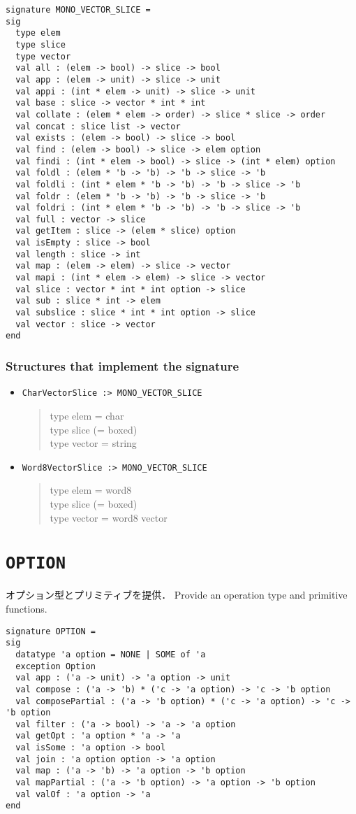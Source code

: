 \documentclass{jbook}
\newcommand{\txt}[2]{#2}
\newcommand{\code}[1]{\mbox{\large\tt #1}}
\newenvironment{program}{\begin{quote}\begin{tt}}%
                        {\end{tt}\end{quote}}
\newcommand{\signature}[2]{
\section{{\tt #1}}\label{section:reference:#2}
}
\newcommand{\Structure}{\subsubsection*{\txt{シグネチャを実装するストラクチャ}{Structures that implement the signature}}}
\begin{document}
\begin{verbatim}
signature MONO_VECTOR_SLICE =
sig
  type elem
  type slice
  type vector
  val all : (elem -> bool) -> slice -> bool
  val app : (elem -> unit) -> slice -> unit
  val appi : (int * elem -> unit) -> slice -> unit
  val base : slice -> vector * int * int
  val collate : (elem * elem -> order) -> slice * slice -> order
  val concat : slice list -> vector
  val exists : (elem -> bool) -> slice -> bool
  val find : (elem -> bool) -> slice -> elem option
  val findi : (int * elem -> bool) -> slice -> (int * elem) option
  val foldl : (elem * 'b -> 'b) -> 'b -> slice -> 'b
  val foldli : (int * elem * 'b -> 'b) -> 'b -> slice -> 'b
  val foldr : (elem * 'b -> 'b) -> 'b -> slice -> 'b
  val foldri : (int * elem * 'b -> 'b) -> 'b -> slice -> 'b
  val full : vector -> slice
  val getItem : slice -> (elem * slice) option
  val isEmpty : slice -> bool
  val length : slice -> int
  val map : (elem -> elem) -> slice -> vector
  val mapi : (int * elem -> elem) -> slice -> vector
  val slice : vector * int * int option -> slice
  val sub : slice * int -> elem
  val subslice : slice * int * int option -> slice
  val vector : slice -> vector
end
\end{verbatim}

\Structure
\begin{itemize}
\item \code{CharVectorSlice :> MONO\_VECTOR\_SLICE}
\begin{program}
    type elem = char
\\
    type slice (= boxed)
\\
    type vector = string
\end{program}
\item \code{Word8VectorSlice :> MONO\_VECTOR\_SLICE}
\begin{program}
    type elem = word8
\\
    type slice (= boxed)
\\
    type vector = word8 vector
\end{program}
\end{itemize}

\signature{OPTION}{OPTION}
\ifjp%
	オプション型とプリミティブを提供．
\else%
	Provide an operation type and primitive functions.
\fi%

\begin{verbatim}
signature OPTION =
sig
  datatype 'a option = NONE | SOME of 'a
  exception Option
  val app : ('a -> unit) -> 'a option -> unit
  val compose : ('a -> 'b) * ('c -> 'a option) -> 'c -> 'b option
  val composePartial : ('a -> 'b option) * ('c -> 'a option) -> 'c -> 'b option
  val filter : ('a -> bool) -> 'a -> 'a option
  val getOpt : 'a option * 'a -> 'a
  val isSome : 'a option -> bool
  val join : 'a option option -> 'a option
  val map : ('a -> 'b) -> 'a option -> 'b option
  val mapPartial : ('a -> 'b option) -> 'a option -> 'b option
  val valOf : 'a option -> 'a
end
\end{verbatim}
\end{document}
